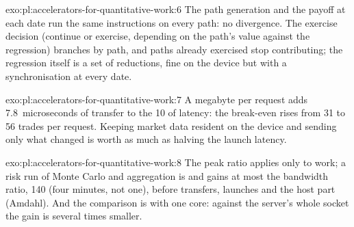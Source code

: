 \begin{solution}{exo:pl:accelerators-for-quantitative-work:6}
The path generation and the payoff at each date run the same instructions on every path: no divergence. The exercise decision (continue or
exercise, depending on the path's value against the regression) branches by path, and paths already exercised stop contributing; the
regression itself is a set of reductions, fine on the device but with a synchronisation at every date.
\end{solution}

\begin{solution}{exo:pl:accelerators-for-quantitative-work:7}
A megabyte per request adds 7.8~microseconds of transfer to the 10 of latency: the break-even rises from 31 to 56 trades per request. Keeping
market data resident on the device and sending only what changed is worth as much as halving the launch latency.
\end{solution}

\begin{solution}{exo:pl:accelerators-for-quantitative-work:8}
The peak ratio applies only to  work; a risk run of Monte Carlo and aggregation is  and gains at most the bandwidth
ratio, 140 (four minutes, not one), before transfers, launches and the host part (Amdahl). And the comparison is with one core: against the
server's whole socket the gain is several times smaller.
\end{solution}

